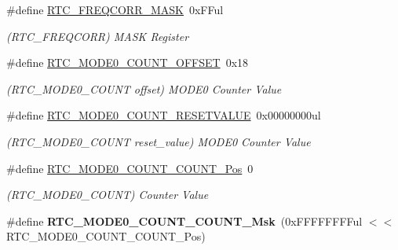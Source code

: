 \begin{DoxyCompactItemize}
\item 
\hypertarget{group___s_a_m_l21___r_t_c_ga40cc845a8d0d60c11881f84adeff7947}{}\#define \hyperlink{group___s_a_m_l21___r_t_c_ga40cc845a8d0d60c11881f84adeff7947}{R\+T\+C\+\_\+\+F\+R\+E\+Q\+C\+O\+R\+R\+\_\+\+M\+A\+S\+K}~0x\+F\+Ful\label{group___s_a_m_l21___r_t_c_ga40cc845a8d0d60c11881f84adeff7947}

\begin{DoxyCompactList}\small\item\em (R\+T\+C\+\_\+\+F\+R\+E\+Q\+C\+O\+R\+R) M\+A\+S\+K Register \end{DoxyCompactList}\item 
\hypertarget{group___s_a_m_l21___r_t_c_gad9373b782c3160b8074bf71abfd9eb7e}{}\#define \hyperlink{group___s_a_m_l21___r_t_c_gad9373b782c3160b8074bf71abfd9eb7e}{R\+T\+C\+\_\+\+M\+O\+D\+E0\+\_\+\+C\+O\+U\+N\+T\+\_\+\+O\+F\+F\+S\+E\+T}~0x18\label{group___s_a_m_l21___r_t_c_gad9373b782c3160b8074bf71abfd9eb7e}

\begin{DoxyCompactList}\small\item\em (R\+T\+C\+\_\+\+M\+O\+D\+E0\+\_\+\+C\+O\+U\+N\+T offset) M\+O\+D\+E0 Counter Value \end{DoxyCompactList}\item 
\hypertarget{group___s_a_m_l21___r_t_c_ga195a04c68c30c2bfa06a58e9d7909e7f}{}\#define \hyperlink{group___s_a_m_l21___r_t_c_ga195a04c68c30c2bfa06a58e9d7909e7f}{R\+T\+C\+\_\+\+M\+O\+D\+E0\+\_\+\+C\+O\+U\+N\+T\+\_\+\+R\+E\+S\+E\+T\+V\+A\+L\+U\+E}~0x00000000ul\label{group___s_a_m_l21___r_t_c_ga195a04c68c30c2bfa06a58e9d7909e7f}

\begin{DoxyCompactList}\small\item\em (R\+T\+C\+\_\+\+M\+O\+D\+E0\+\_\+\+C\+O\+U\+N\+T reset\+\_\+value) M\+O\+D\+E0 Counter Value \end{DoxyCompactList}\item 
\hypertarget{group___s_a_m_l21___r_t_c_ga1939409f3de229eaa5f11e154a85b00e}{}\#define \hyperlink{group___s_a_m_l21___r_t_c_ga1939409f3de229eaa5f11e154a85b00e}{R\+T\+C\+\_\+\+M\+O\+D\+E0\+\_\+\+C\+O\+U\+N\+T\+\_\+\+C\+O\+U\+N\+T\+\_\+\+Pos}~0\label{group___s_a_m_l21___r_t_c_ga1939409f3de229eaa5f11e154a85b00e}

\begin{DoxyCompactList}\small\item\em (R\+T\+C\+\_\+\+M\+O\+D\+E0\+\_\+\+C\+O\+U\+N\+T) Counter Value \end{DoxyCompactList}\item 
\hypertarget{group___s_a_m_l21___r_t_c_ga94153484709916defc61e617557c96c5}{}\#define {\bfseries R\+T\+C\+\_\+\+M\+O\+D\+E0\+\_\+\+C\+O\+U\+N\+T\+\_\+\+C\+O\+U\+N\+T\+\_\+\+Msk}~(0x\+F\+F\+F\+F\+F\+F\+F\+Ful $<$$<$ R\+T\+C\+\_\+\+M\+O\+D\+E0\+\_\+\+C\+O\+U\+N\+T\+\_\+\+C\+O\+U\+N\+T\+\_\+\+Pos)\label{group___s_a_m_l21___r_t_c_ga94153484709916defc61e617557c96c5}


\end{DoxyCompactItemize}
